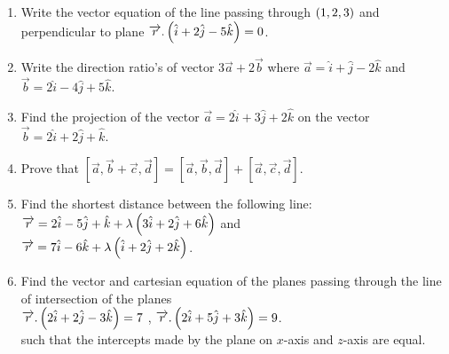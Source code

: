 \begin{enumerate}
\item Write the vector equation of the line passing through $\left(1,2,3\right)$ and perpendicular to plane $\overrightarrow{r}.\left(\hat{i}+2\hat{j}-5\hat{k}\right)=0$.\\

\item Write the direction ratio's of vector $3\overrightarrow{a}+2\overrightarrow{b}$ where $\overrightarrow{a} = \hat{i}+\hat{j}-2\hat{k}$ and $\overrightarrow{b}=2\hat{i}-4\hat{j}+5\hat{k}$.\\

\item Find the projection of the vector $\overrightarrow{a} = 2\hat{i}+3\hat{j}+2\hat{k}$ on the vector $\overrightarrow{b} = 2\hat{i}+2\hat{j}+\hat{k}$.\\ 

\item Prove that $[ \overrightarrow{a},\overrightarrow{b} + \overrightarrow{c},\overrightarrow{d}] = [ \overrightarrow{a},\overrightarrow{b},\overrightarrow{d} ] +[ \overrightarrow{a},\overrightarrow{c},\overrightarrow{d} ]$.\\

\item Find the shortest distance between the following line:
$\overrightarrow{r}=2\hat{i}-5\hat{j}+\hat{k}+\lambda\left(3\hat{i}+2\hat{j}+6\hat{k}\right)$ and \\
$\overrightarrow{r}=7\hat{i}-6\hat{k}+\lambda\left(\hat{i}+2\hat{j}+2\hat{k}\right)$.

\item Find the vector and cartesian equation of the planes passing through the line of intersection of the planes\\
$\overrightarrow{r}.\left(2\hat{i}+2\hat{j}-3\hat{k}\right)=7 $ , $\overrightarrow{r}.\left(2\hat{i}+5\hat{j}+3\hat{k}\right)=9 $.\\
such that the intercepts made by the plane on $x$-axis and $z$-axis are equal.
\end{enumerate}
